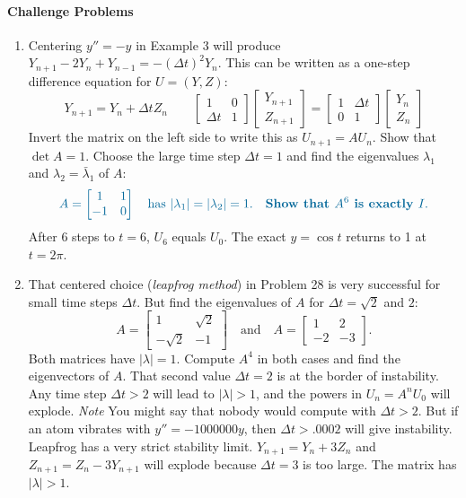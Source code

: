 \documentclass[14pt, a4paper]{article}
\begin{document}
\paragraph{Challenge Problems}
\begin{enumerate}[resume]
    \item Centering $y'' = -y$ in Example 3 will produce $Y_{n+1} - 2Y_n + Y_{n-1} = -(\Delta t)^2 Y_n$. This can be written as a one-step difference equation for $U = (Y, Z)$:
          \[
              Y_{n+1} = Y_n + \Delta t Z_n \qquad \begin{bmatrix} 1 & 0 \\ \Delta t & 1 \end{bmatrix} \begin{bmatrix} Y_{n+1} \\ Z_{n+1} \end{bmatrix} = \begin{bmatrix} 1 & \Delta t \\ 0 & 1 \end{bmatrix} \begin{bmatrix} Y_n \\ Z_n \end{bmatrix}
          \]
          Invert the matrix on the left side to write this as $U_{n+1} = AU_n$. Show that $\det A = 1$. Choose the large time step $\Delta t = 1$ and find the eigenvalues $\lambda_1$ and $\lambda_2 = \bar{\lambda}_1$ of $A$:
          \[
              \textcolor{blue!60!green}{A = \begin{bmatrix} 1 & 1 \\ -1 & 0 \end{bmatrix} \quad \text{has } |\lambda_1| = |\lambda_2| = 1. \quad \textbf{Show that } A^6 \textbf{ is exactly } I.}
          \]
          After 6 steps to $t = 6$, $U_6$ equals $U_0$. The exact $y = \cos t$ returns to 1 at $t = 2\pi$.

    \item That centered choice (\textit{leapfrog method}) in Problem 28 is very successful for small time steps $\Delta t$. But find the eigenvalues of $A$ for $\Delta t = \sqrt{2}$ and $2$:
          \[
              A = \begin{bmatrix} 1 & \sqrt{2} \\ -\sqrt{2} & -1 \end{bmatrix} \quad \text{and} \quad A = \begin{bmatrix} 1 & 2 \\ -2 & -3 \end{bmatrix} .
          \]
          Both matrices have $|\lambda| = 1$. Compute $A^4$ in both cases and find the eigenvectors of $A$. That second value $\Delta t = 2$ is at the border of instability. Any time step $\Delta t > 2$ will lead to $|\lambda| > 1$, and the powers in $U_n = A^n U_0$ will explode.
          \textit{Note} You might say that nobody would compute with $\Delta t > 2$. But if an atom vibrates with $y'' = -1000000y$, then $\Delta t > .0002$ will give instability. Leapfrog has a very strict stability limit. $Y_{n+1} = Y_n + 3Z_n$ and $Z_{n+1} = Z_n - 3Y_{n+1}$ will explode because $\Delta t = 3$ is too large. The matrix has $|\lambda| > 1$.


\end{enumerate}
\end{document}
